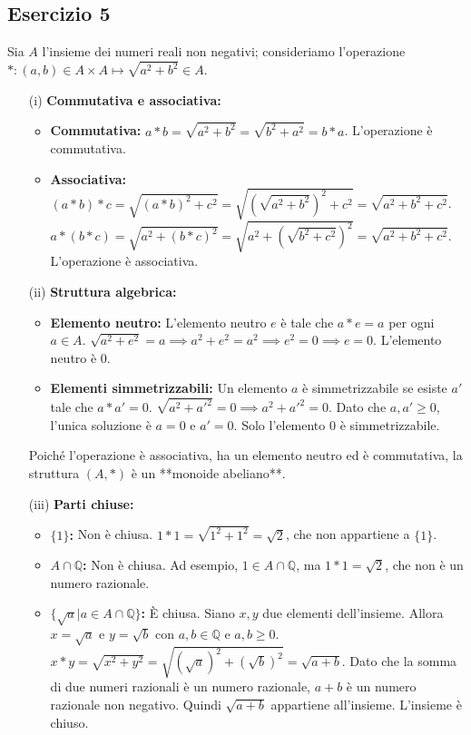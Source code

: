 \subsection*{Esercizio 5}
Sia $A$ l'insieme dei numeri reali non negativi; consideriamo l'operazione $*:(a,b)\in A\times A\mapsto\sqrt{a^{2}+b^{2}}\in A$.
\begin{itemize}
    \item[(i)] \textbf{Commutativa e associativa:}
    \begin{itemize}
        \item \textbf{Commutativa:} $a*b = \sqrt{a^2+b^2} = \sqrt{b^2+a^2} = b*a$. L'operazione è commutativa.
        \item \textbf{Associativa:} $(a*b)*c = \sqrt{(a*b)^2+c^2} = \sqrt{(\sqrt{a^2+b^2})^2+c^2} = \sqrt{a^2+b^2+c^2}$.
        $a*(b*c) = \sqrt{a^2+(b*c)^2} = \sqrt{a^2+(\sqrt{b^2+c^2})^2} = \sqrt{a^2+b^2+c^2}$.
        L'operazione è associativa.
    \end{itemize}
    \item[(ii)] \textbf{Struttura algebrica:}
    \begin{itemize}
        \item \textbf{Elemento neutro:} L'elemento neutro $e$ è tale che $a*e = a$ per ogni $a\in A$.
        $\sqrt{a^2+e^2}=a \implies a^2+e^2=a^2 \implies e^2=0 \implies e=0$. L'elemento neutro è $0$.
        \item \textbf{Elementi simmetrizzabili:} Un elemento $a$ è simmetrizzabile se esiste $a'$ tale che $a*a'=0$.
        $\sqrt{a^2+a'^2}=0 \implies a^2+a'^2=0$. Dato che $a,a' \ge 0$, l'unica soluzione è $a=0$ e $a'=0$.
        Solo l'elemento $0$ è simmetrizzabile.
    \end{itemize}
    Poiché l'operazione è associativa, ha un elemento neutro ed è commutativa, la struttura $(A, *)$ è un **monoide abeliano**.

    \item[(iii)] \textbf{Parti chiuse:}
    \begin{itemize}
        \item \textbf{$\{1\}$:} Non è chiusa. $1*1 = \sqrt{1^2+1^2} = \sqrt{2}$, che non appartiene a $\{1\}$.
        \item \textbf{$A\cap\mathbb{Q}$:} Non è chiusa. Ad esempio, $1\in A\cap\mathbb{Q}$, ma $1*1=\sqrt{2}$, che non è un numero razionale.
        \item \textbf{$\{\sqrt{a}|a\in A\cap\mathbb{Q}\}$:} È chiusa. Siano $x,y$ due elementi dell'insieme. Allora $x=\sqrt{a}$ e $y=\sqrt{b}$ con $a,b\in\mathbb{Q}$ e $a,b\ge 0$.
        $x*y=\sqrt{x^2+y^2}=\sqrt{(\sqrt{a})^2+(\sqrt{b})^2}=\sqrt{a+b}$.
        Dato che la somma di due numeri razionali è un numero razionale, $a+b$ è un numero razionale non negativo. Quindi $\sqrt{a+b}$ appartiene all'insieme. L'insieme è chiuso.
    \end{itemize}
\end{itemize}
